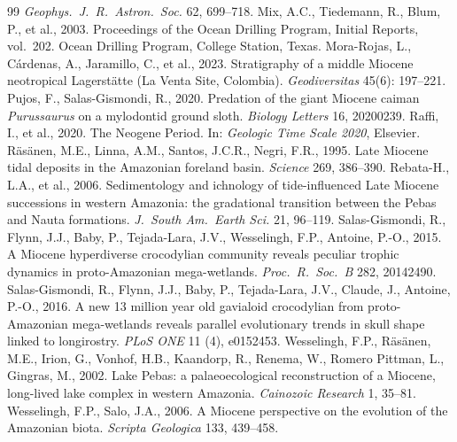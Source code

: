 \documentclass[11pt]{article}
\begin{document}
\begin{thebibliography}{99}
\textit{Geophys.\ J.\ R.\ Astron.\ Soc.} 62, 699--718.
 Mix, A.C., Tiedemann, R., Blum, P., et al.,
2003. Proceedings of the Ocean Drilling Program, Initial Reports, vol.~202. Ocean
Drilling Program, College Station, Texas.
 Mora-Rojas, L., C\'ardenas, A.,
Jaramillo, C., et al., 2023. Stratigraphy of a middle Miocene neotropical
Lagerst\"atte (La Venta Site, Colombia). \textit{Geodiversitas} 45(6): 197--221.
 Pujos, F.,
Salas-Gismondi, R., 2020. Predation of the giant Miocene caiman
\textit{Purussaurus} on a mylodontid ground sloth. \textit{Biology Letters}
16, 20200239.
 Raffi, I., et al., 2020. The Neogene
Period. In: \textit{Geologic Time Scale 2020}, Elsevier.
 R\"as\"anen, M.E., Linna, A.M.,
Santos, J.C.R., Negri, F.R., 1995. Late Miocene tidal deposits in the Amazonian
foreland basin. \textit{Science} 269, 386--390.
 Rebata-H., L.A., et al., 2006.
Sedimentology and ichnology of tide-influenced Late Miocene successions in
western Amazonia: the gradational transition between the Pebas and Nauta
formations. \textit{J.\ South Am.\ Earth Sci.} 21, 96--119.
 Salas-Gismondi, R.,
Flynn, J.J., Baby, P., Tejada-Lara, J.V., Wesselingh, F.P., Antoine, P.-O., 2015.
A Miocene hyperdiverse crocodylian community reveals peculiar trophic dynamics in
proto-Amazonian mega-wetlands. \textit{Proc.\ R.\ Soc.\ B} 282, 20142490.
 Salas-Gismondi, R.,
Flynn, J.J., Baby, P., Tejada-Lara, J.V., Claude, J., Antoine, P.-O., 2016. A new
13 million year old gavialoid crocodylian from proto-Amazonian mega-wetlands
reveals parallel evolutionary trends in skull shape linked to longirostry.
\textit{PLoS ONE} 11 (4), e0152453.
 Wesselingh, F.P.,
R\"as\"anen, M.E., Irion, G., Vonhof, H.B., Kaandorp, R., Renema, W.,
Romero Pittman, L., Gingras, M., 2002. Lake Pebas: a palaeoecological
reconstruction of a Miocene, long-lived lake complex in western Amazonia.
\textit{Cainozoic Research} 1, 35--81.
 Wesselingh, F.P.,
Salo, J.A., 2006. A Miocene perspective on the evolution of the Amazonian
biota. \textit{Scripta Geologica} 133, 439--458.
\end{thebibliography}
\end{document}
